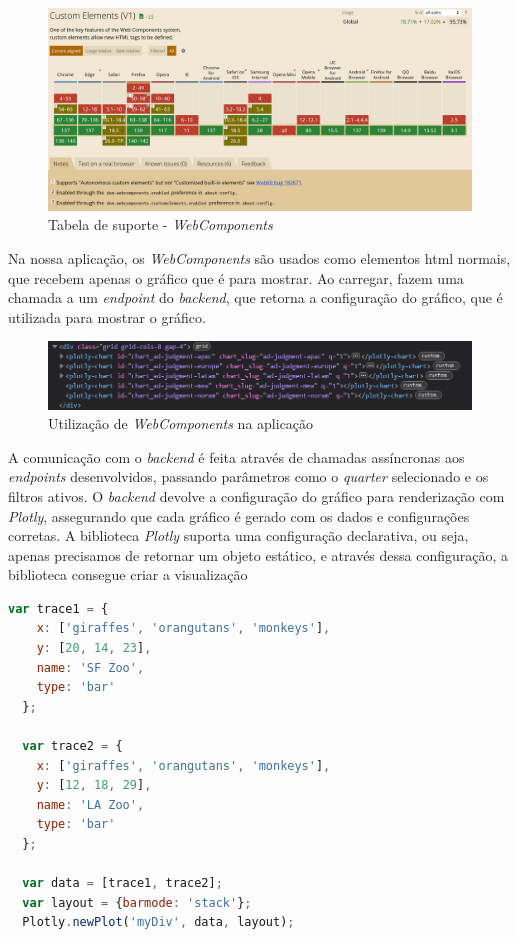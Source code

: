 \begin{figure}[H]
    \centering
    \includegraphics[width=\textwidth]{./img/caniuse}
 \caption{Tabela de suporte - \textit{WebComponents}}
 \end{figure}

Na nossa aplicação, os \textit{WebComponents} são usados como elementos \gls{html} normais, que recebem apenas o gráfico que é para mostrar. Ao carregar, fazem uma chamada a um \textit{endpoint} do \textit{backend}, que retorna a configuração do gráfico, que é utilizada para mostrar o gráfico.

\begin{figure}[H]
    \centering
    \includegraphics[width=\textwidth]{./img/webc}
 \caption{Utilização de \textit{WebComponents} na aplicação}
 \end{figure}

A comunicação com o \textit{backend} é feita através de chamadas assíncronas aos \textit{endpoints} desenvolvidos, passando parâmetros como o \textit{quarter} selecionado e os filtros ativos. O \textit{backend} devolve a configuração do gráfico para renderização com \textit{Plotly}, assegurando que cada gráfico é gerado com os dados e configurações corretas. A biblioteca \textit{Plotly} suporta uma configuração declarativa, ou seja, apenas precisamos de retornar um objeto estático, e através dessa configuração, a biblioteca consegue criar a visualização

\begin{lstlisting}[language=Javascript, caption={Excerto de uma configuração para um gráfico com a utilização da biblioteca \textit{Plotly}}]
  var trace1 = {
    x: ['giraffes', 'orangutans', 'monkeys'],
    y: [20, 14, 23],
    name: 'SF Zoo',
    type: 'bar'
  };
  
  var trace2 = {
    x: ['giraffes', 'orangutans', 'monkeys'],
    y: [12, 18, 29],
    name: 'LA Zoo',  
    type: 'bar'
  };
  
  var data = [trace1, trace2];
  var layout = {barmode: 'stack'};
  Plotly.newPlot('myDiv', data, layout);
\end{lstlisting}

